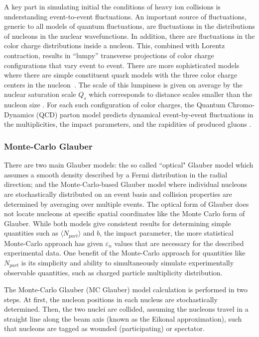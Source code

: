 A key part in simulating initial the conditions of heavy ion collisions is understanding event-to-event fluctuations.  An important source of fluctuations, generic to all models of quantum fluctuations, are fluctuations in the distributions of nucleons in the nuclear wavefunctions. In addition, there are fluctuations in the color charge distributions inside a nucleon. This, combined with Lorentz contraction, results in “lumpy” transverse projections of color charge configurations that vary event to event. There are more sophisticated models where there are simple constituent quark models with the three color charge centers in the nucleon~\cite{PhysRevC.94.024919}. The scale of this lumpiness is given on average by the nuclear saturation scale $Q_s$ which corresponds to distance scales smaller than the nucleon size . For each such configuration of color charges, the Quantum Chromo-Dynamics (QCD) parton model predicts dynamical event-by-event fluctuations in the multiplicities, the impact parameters, and the rapidities of produced gluons \cite{PhysRevLett.108.252301}.

\subsubsection{Monte-Carlo Glauber}
There are two main Glauber models: the so called ``optical" Glauber model which assumes a smooth density described by a Fermi distribution in the radial direction; and the Monte-Carlo-based Glauber model where individual nucleons are stochastically distributed on an event basis and collision properties are determined by averaging over multiple events. The optical form of Glauber does not locate nucleons at specific spatial coordinates like the Monte Carlo form of Glauber. While both models give consistent results for determining simple quantities such as $\langle N_{part}\rangle$ and $b$, the impact parameter, the more statistical Monte-Carlo approach has given $\varepsilon_n$ values that are necessary for the described experimental data. One benefit of the Monte-Carlo approach for quantities like $N_{part}$ is its simplicity and ability to simultaneously simulate experimentally observable quantities, such as charged particle multiplicity distribution.

The Monte-Carlo Glauber (MC Glauber) model calculation is performed in two steps. At first, the nucleon positions in each nucleus are stochastically determined. Then, the two nuclei are collided, assuming the nucleons travel in a straight line along the beam axis (known as the Eikonal approximation), such that nucleons are tagged as wounded (participating) or spectator.

